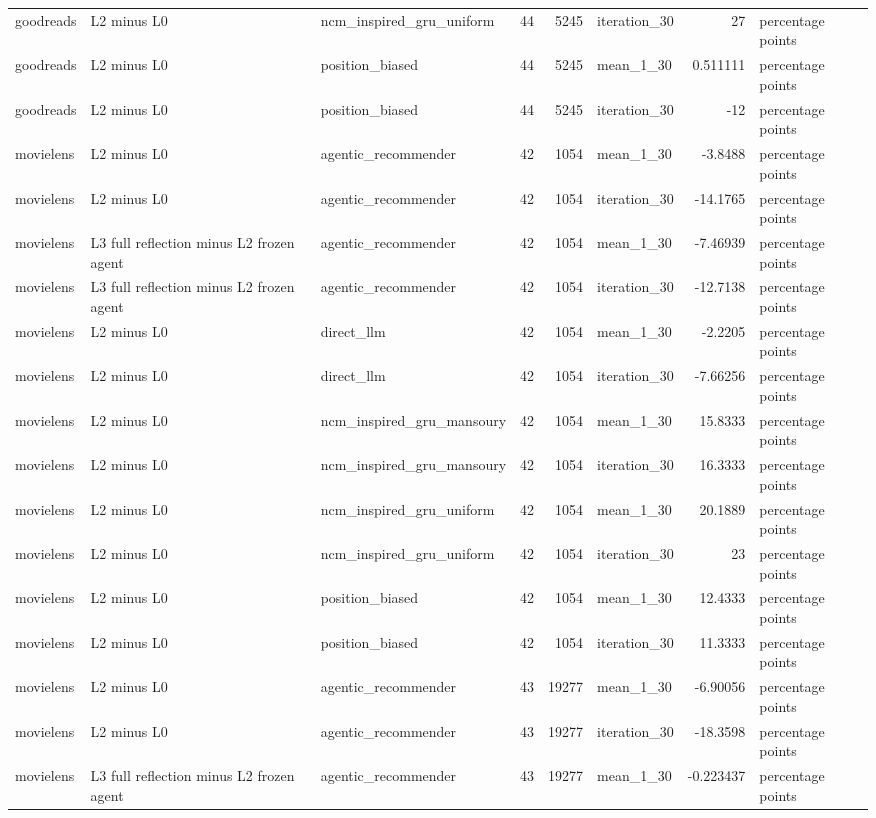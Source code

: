 \begin{table}[htbp!]
\begin{tabular}{lllrrlrl}
goodreads & L2 minus L0 & ncm\_inspired\_gru\_uniform & 44 & 5245 & iteration\_30 & 27 & percentage points \\
goodreads & L2 minus L0 & position\_biased & 44 & 5245 & mean\_1\_30 & 0.511111 & percentage points \\
goodreads & L2 minus L0 & position\_biased & 44 & 5245 & iteration\_30 & -12 & percentage points \\
movielens & L2 minus L0 & agentic\_recommender & 42 & 1054 & mean\_1\_30 & -3.8488 & percentage points \\
movielens & L2 minus L0 & agentic\_recommender & 42 & 1054 & iteration\_30 & -14.1765 & percentage points \\
movielens & L3 full reflection minus L2 frozen agent & agentic\_recommender & 42 & 1054 & mean\_1\_30 & -7.46939 & percentage points \\
movielens & L3 full reflection minus L2 frozen agent & agentic\_recommender & 42 & 1054 & iteration\_30 & -12.7138 & percentage points \\
movielens & L2 minus L0 & direct\_llm & 42 & 1054 & mean\_1\_30 & -2.2205 & percentage points \\
movielens & L2 minus L0 & direct\_llm & 42 & 1054 & iteration\_30 & -7.66256 & percentage points \\
movielens & L2 minus L0 & ncm\_inspired\_gru\_mansoury & 42 & 1054 & mean\_1\_30 & 15.8333 & percentage points \\
movielens & L2 minus L0 & ncm\_inspired\_gru\_mansoury & 42 & 1054 & iteration\_30 & 16.3333 & percentage points \\
movielens & L2 minus L0 & ncm\_inspired\_gru\_uniform & 42 & 1054 & mean\_1\_30 & 20.1889 & percentage points \\
movielens & L2 minus L0 & ncm\_inspired\_gru\_uniform & 42 & 1054 & iteration\_30 & 23 & percentage points \\
movielens & L2 minus L0 & position\_biased & 42 & 1054 & mean\_1\_30 & 12.4333 & percentage points \\
movielens & L2 minus L0 & position\_biased & 42 & 1054 & iteration\_30 & 11.3333 & percentage points \\
movielens & L2 minus L0 & agentic\_recommender & 43 & 19277 & mean\_1\_30 & -6.90056 & percentage points \\
movielens & L2 minus L0 & agentic\_recommender & 43 & 19277 & iteration\_30 & -18.3598 & percentage points \\
movielens & L3 full reflection minus L2 frozen agent & agentic\_recommender & 43 & 19277 & mean\_1\_30 & -0.223437 & percentage points \\

\end{tabular}
\end{table}
